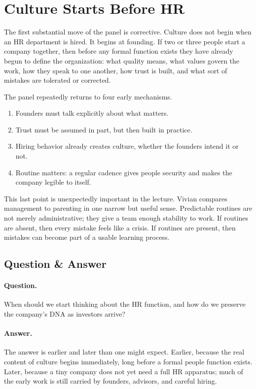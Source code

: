 \section{Culture Starts Before HR}

The first substantial move of the panel is corrective. Culture does not begin when an HR department is hired. It begins at founding. If two or three people start a company together, then before any formal function exists they have already begun to define the organization: what quality means, what values govern the work, how they speak to one another, how trust is built, and what sort of mistakes are tolerated or corrected.

The panel repeatedly returns to four early mechanisms.

\begin{enumerate}
\item Founders must talk explicitly about what matters.
\item Trust must be assumed in part, but then built in practice.
\item Hiring behavior already creates culture, whether the founders intend it or not.
\item Routine matters: a regular cadence gives people security and makes the company legible to itself.
\end{enumerate}

This last point is unexpectedly important in the lecture. Vivian compares management to parenting in one narrow but useful sense. Predictable routines are not merely administrative; they give a team enough stability to work. If routines are absent, then every mistake feels like a crisis. If routines are present, then mistakes can become part of a usable learning process.

\subsection{Question \& Answer}

\paragraph{Question.} When should we start thinking about the HR function, and how do we preserve the company's DNA as investors arrive?

\paragraph{Answer.} The answer is earlier and later than one might expect. Earlier, because the real content of culture begins immediately, long before a formal people function exists. Later, because a tiny company does not yet need a full HR apparatus; much of the early work is still carried by founders, advisors, and careful hiring.


